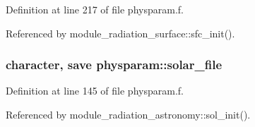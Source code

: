 Definition at line 217 of file physparam.\+f.



Referenced by module\+\_\+radiation\+\_\+surface\+::sfc\+\_\+init().

\subsubsection[{\texorpdfstring{solar\+\_\+file}{solar_file}}]{\setlength{\rightskip}{0pt plus 5cm}character, save physparam\+::solar\+\_\+file}\hypertarget{namespacephysparam_a6472b7762518054a168d4aa915da38f8}{}\label{namespacephysparam_a6472b7762518054a168d4aa915da38f8}


Definition at line 145 of file physparam.\+f.



Referenced by module\+\_\+radiation\+\_\+astronomy\+::sol\+\_\+init().

